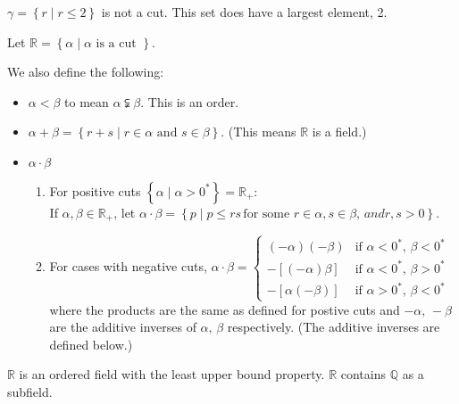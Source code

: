 \documentclass[../main.tex]{subfiles}
\begin{document}
\begin{example}[]
    \( \gamma = \left\{ r \mid r \leq 2 \right\} \) is not a cut.
    This set does have a largest element, 2.
\end{example}

\begin{definition}
    Let \( \mathbb{R} = \left\{ \alpha \mid \alpha \text{ is a cut } \right\}\).
\end{definition}

We also define the following:
\begin{itemize}
    \item \( \alpha < \beta \) to mean \( \alpha \subsetneqq \beta \). This is an order.
    \item \( \alpha + \beta = \left\{ r + s \mid r \in \alpha \text{ and } s \in \beta \right\} \). (This means \( \mathbb{R} \) is a field.)
    \item \( \alpha \cdot \beta \)
    \begin{enumerate}
        \item For positive cuts \( \left\{ \alpha \mid \alpha > 0^* \right\} = \mathbb{R}_+ \): \\
            If \( \alpha, \beta \in \mathbb{R}_+ \), let \( \alpha \cdot \beta = \left\{ p \mid p \leq rs \, \text{for some } r \in \alpha, s \in \beta, \, and  r,s>0\right\} \).
        \item For cases with negative cuts, \( \alpha \cdot \beta =
        \begin{cases}
            (-\alpha)(-\beta) & \text{if } \alpha < 0^*, \, \beta < 0^* \\
            -[(-\alpha)\beta] & \text{if } \alpha < 0^*, \, \beta > 0^* \\
            -[\alpha(-\beta)] & \text{if } \alpha > 0^*, \, \beta < 0^*
        \end{cases} \) \\
        where the products are the same as defined for postive cuts and \( -\alpha, \, -\beta \) are the additive inverses of \( \alpha, \, \beta \) respectively.
        (The additive inverses are defined below.)
    \end{enumerate}
\end{itemize}

\begin{theorem}[]
    \label{thm_R}
    \( \mathbb{R} \) is an ordered field with the least upper bound property.
    \( \mathbb{R} \) contains \( \mathbb{Q} \) as a subfield.
\end{theorem}
\end{document}
